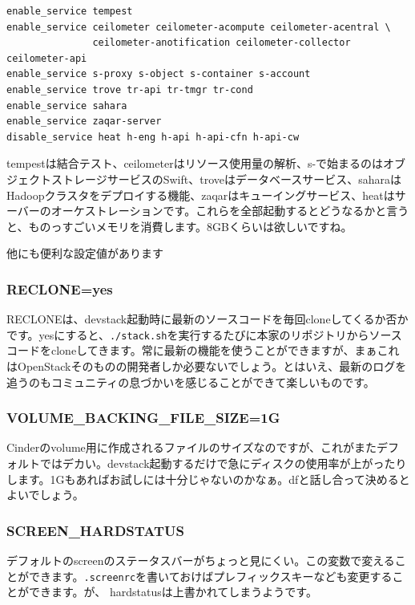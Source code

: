\documentclass[9pt,b5paper,tombo,openany,dvipdfmx]{jsbook}
\begin{document}
\begin{lstlisting}
enable_service tempest
enable_service ceilometer ceilometer-acompute ceilometer-acentral \
               ceilometer-anotification ceilometer-collector ceilometer-api
enable_service s-proxy s-object s-container s-account
enable_service trove tr-api tr-tmgr tr-cond
enable_service sahara
enable_service zaqar-server
disable_service heat h-eng h-api h-api-cfn h-api-cw
\end{lstlisting}

tempestは結合テスト、ceilometerはリソース使用量の解析、s-で始まるのはオブジェクトストレージサービスのSwift、troveはデータベースサービス、saharaはHadoopクラスタをデプロイする機能、zaqarはキューイングサービス、heatはサーバーのオーケストレーションです。これらを全部起動するとどうなるかと言うと、ものっすごいメモリを消費します。8GBくらいは欲しいですね。

他にも便利な設定値があります

\subsubsection{RECLONE=yes}

RECLONEは、devstack起動時に最新のソースコードを毎回cloneしてくるか否かです。yesにすると、\verb|./stack.sh|を実行するたびに本家のリポジトリからソースコードをcloneしてきます。常に最新の機能を使うことができますが、まぁこれはOpenStackそのものの開発者しか必要ないでしょう。とはいえ、最新のログを追うのもコミュニティの息づかいを感じることができて楽しいものです。

\subsubsection{VOLUME\_BACKING\_FILE\_SIZE=1G}

Cinderのvolume用に作成されるファイルのサイズなのですが、これがまたデフォルトではデカい。devstack起動するだけで急にディスクの使用率が上がったりします。1Gもあればお試しには十分じゃないのかなぁ。dfと話し合って決めるとよいでしょう。

\subsubsection{SCREEN\_HARDSTATUS}

デフォルトのscreenのステータスバーがちょっと見にくい。この変数で変えることができます。\verb|.screenrc|を書いておけばプレフィックスキーなども変更することができます。が、 hardstatusは上書かれてしまうようです。
\end{document}
